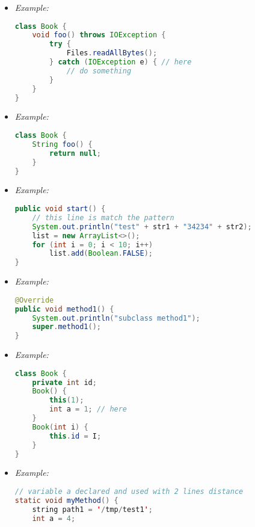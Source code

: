 \begin{itemize}
	\item {}
{\it Example:}
\begin{lstlisting}[language=Java]
class Book {
	void foo() throws IOException {
		try {
			Files.readAllBytes();
		} catch (IOException e) { // here
			// do something
		}
	}
}
\end{lstlisting}

	\item {}
{\it Example:}
\begin{lstlisting}[language=Java]
class Book {
	String foo() {
		return null;
	}
}
\end{lstlisting}

	\item {}
{\it Example:}
\begin{lstlisting}[language=Java]
public void start() {
	// this line is match the pattern
	System.out.println("test" + str1 + "34234" + str2);
	list = new ArrayList<>();
	for (int i = 0; i < 10; i++)
		list.add(Boolean.FALSE);
}
\end{lstlisting}

	\item {}
{\it Example:}
\begin{lstlisting}[language=Java]
@Override
public void method1() {
	System.out.println("subclass method1");
	super.method1();
}
\end{lstlisting}

	\item {}
{\it Example:}
\begin{lstlisting}[language=Java]
class Book {
	private int id;
	Book() {
		this(1);
		int a = 1; // here
	}
	Book(int i) {
		this.id = I;
	}
}
\end{lstlisting}

	\item {}
{\it Example:}
\begin{lstlisting}[language=Java]
// variable a declared and used with 2 lines distance
static void myMethod() { 
	string path1 = '/tmp/test1';
	int a = 4;
	

\end{lstlisting}
\end{itemize}
